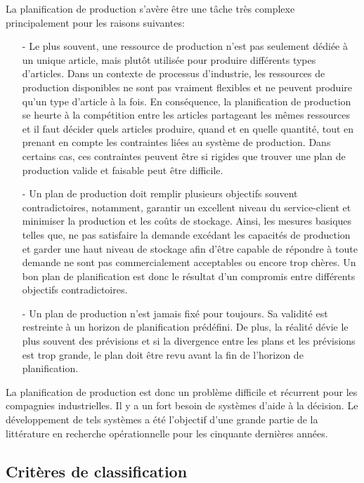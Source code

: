 \documentclass[12pt,a4paper]{article}
\begin{document}
 La planification de production s'avère être une tâche très complexe principalement pour les raisons suivantes:
 \begin{itemize}
 	\item[-] Le plus souvent, une ressource de production n'est pas seulement dédiée à un unique article, mais plutôt utilisée pour produire différents types d'articles. Dans un contexte de processus d'industrie, les ressources de production disponibles ne sont pas vraiment flexibles et ne peuvent produire qu'un type d'article à la fois. En conséquence, la planification de production se heurte à la compétition entre les articles partageant les mêmes ressources et il faut décider quels articles produire, quand et en quelle quantité, tout en prenant en compte les contraintes liées au système de production. Dans certains cas, ces contraintes peuvent être si rigides que trouver une plan de production valide et faisable peut être difficile.
 	
 	\item[-] Un plan de production doit remplir plusieurs objectifs souvent contradictoires, notamment, garantir un excellent niveau du service-client et minimiser la production et les coûts de stockage. Ainsi, les mesures basiques telles que, ne pas satisfaire la demande excédant les capacités de production et garder une haut niveau de stockage afin d'être capable de répondre à toute demande ne sont pas commercialement acceptables ou encore trop chères. Un bon plan de planification est donc le résultat d'un compromis entre différents objectifs contradictoires.
 	
 	\item[-] Un plan de production n'est jamais fixé pour toujours. Sa validité est restreinte à un horizon de planification prédéfini. De plus, la réalité dévie le plus souvent des prévisions et si la divergence entre les plans et les prévisions est trop grande, le plan doit être revu avant la fin de l'horizon de planification.
 \end{itemize}
 
 La planification de production est donc un problème difficile et récurrent pour les compagnies industrielles. Il y a un fort besoin de systèmes d'aide à la décision. Le développement de tels systèmes a été l'objectif d'une grande partie de la littérature en recherche opérationnelle pour les cinquante dernières années. 
	
\subsection{Critères de classification}
\end{document}
